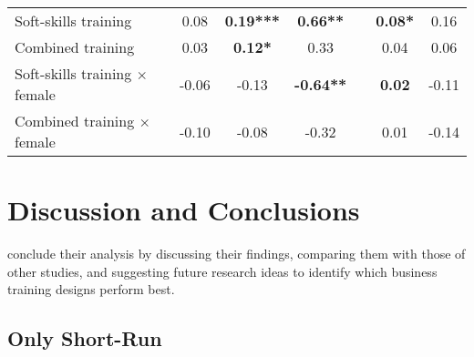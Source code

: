 \begin{table}
\begin{adjustbox}{width=\textwidth}
\begin{tabular}{lccclcc}
\hline
Soft-skills training                                  & 0.08                                                   & \textbf{0.19***}                                          & \textbf{0.66**}                                                  &  & \textbf{0.08*}                                              & 0.16                                                          \\
Combined training                                     & 0.03                                                   & \textbf{0.12*}                                            & 0.33                                                             &  & 0.04                                                        & 0.06                                                          \\
Soft-skills training $\times$ female & -0.06                                                  & -0.13                                                     & \textbf{-0.64**}                                                 &  & \textbf{0.02}                                               & -0.11                                                         \\
Combined training $\times$ female    & -0.10                                                  & -0.08                                                     & -0.32                                                            &  & 0.01                                                        & -0.14                                                         \\
\end{tabular}
\end{adjustbox}
\end{table}

\vspace{-5px}

 \section{Discussion and Conclusions}

\cite{Ubfal2022} conclude their analysis by discussing their findings, comparing them with those of other studies, and suggesting future research ideas to identify which business training designs perform best.

\vspace{-5px}

\subsection{Only Short-Run}

